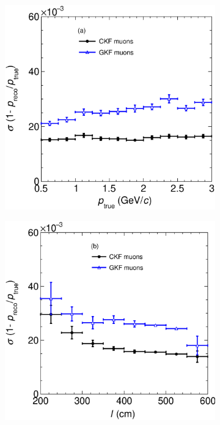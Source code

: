 \begin{figure}[t]
     \centering
     \begin{subfigure}{0.38\textwidth}
         \centering
         \includegraphics[width=\textwidth]{figures/ch5-KF_NDGAr/FullSample/PGun/pRes/RespVSp_pgun.eps}
         \caption{}
         \label{fig:pResVSp_PGun}
     \end{subfigure}
     \begin{subfigure}{0.38\textwidth}
         \centering
         \includegraphics[width=\textwidth]{figures/ch5-KF_NDGAr/FullSample/PGun/pRes/RespVSLength_pgun.eps}

\end{subfigure}
\end{figure}
